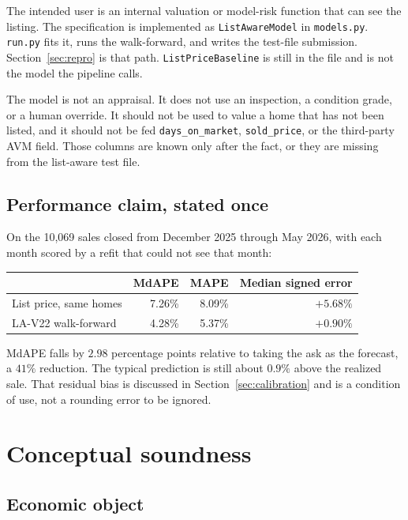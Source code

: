\documentclass[11pt]{article}
\newcommand{\modelid}{LA-V22}
\begin{document}
The intended user is an internal valuation or model-risk function that can see the listing. The specification is implemented as \texttt{ListAwareModel} in \texttt{models.py}. \texttt{run.py} fits it, runs the walk-forward, and writes the test-file submission. Section~\ref{sec:repro} is that path. \texttt{ListPriceBaseline} is still in the file and is not the model the pipeline calls.

The model is not an appraisal. It does not use an inspection, a condition grade, or a human override. It should not be used to value a home that has not been listed, and it should not be fed \texttt{days\_on\_market}, \texttt{sold\_price}, or the third-party AVM field. Those columns are known only after the fact, or they are missing from the list-aware test file.

\subsection{Performance claim, stated once}

On the 10,069 sales closed from December 2025 through May 2026, with each month scored by a refit that could not see that month:

\begin{center}
\begin{tabular}{lrrr}
\toprule
 & MdAPE & MAPE & Median signed error \\
\midrule
List price, same homes & 7.26\% & 8.09\% & \(+5.68\%\) \\
\modelid{} walk-forward & 4.28\% & 5.37\% & \(+0.90\%\) \\
\bottomrule
\end{tabular}
\end{center}

MdAPE falls by \(2.98\) percentage points relative to taking the ask as the forecast, a \(41\%\) reduction. The typical prediction is still about \(0.9\%\) above the realized sale. That residual bias is discussed in Section~\ref{sec:calibration} and is a condition of use, not a rounding error to be ignored.

\section{Conceptual soundness}
\label{sec:concept}

\subsection{Economic object}
\end{document}
